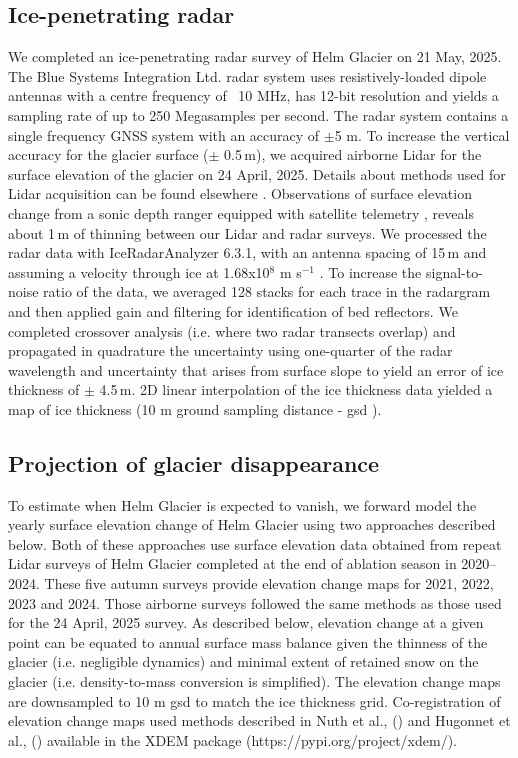 \documentclass[annals,twocolumn,letterpaper]{igs.cls}
\begin{document}
\subsection{Ice-penetrating radar}

We completed an ice-penetrating radar survey of Helm Glacier on 21 May, 2025. The Blue Systems Integration Ltd. radar system uses resistively-loaded dipole antennas with a centre frequency of ~10 MHz, has 12-bit resolution and yields a sampling rate of up to 250 Megasamples per second. The radar system contains a single frequency GNSS system with an accuracy of $\pm$5 m. To increase the vertical accuracy for the glacier surface ($\pm$ 0.5\,m), we acquired airborne Lidar for the surface elevation of the glacier on 24 April, 2025. Details about methods used for Lidar acquisition can be found elsewhere \citep{Menounos2025}.  Observations of surface elevation change from a sonic depth ranger equipped with satellite telemetry \cite{Bevington2025a}, reveals about 1\,m of thinning between our Lidar and radar surveys. We processed the radar data with IceRadarAnalyzer 6.3.1, with an antenna spacing of 15\,m and assuming a velocity through ice at 1.68x10$^{8}$ m s$^{-1}$ \citep{Reynolds2011}. To increase the signal-to-noise ratio of the data, we averaged 128 stacks for each trace in the radargram and then applied gain and filtering for identification of bed reflectors. We completed crossover analysis (i.e. where two radar transects overlap) and propagated in quadrature  the uncertainty using one-quarter of the radar wavelength \cite{Reynolds2011} and uncertainty that arises from surface slope to yield an error of ice thickness of $\pm$ 4.5\,m.  2D linear interpolation of the ice thickness data yielded a map of ice thickness (10 m ground sampling distance - gsd ). 

\subsection{Projection of glacier disappearance}

To estimate when Helm Glacier is expected to vanish, we forward model the yearly surface elevation change of Helm Glacier using two approaches described below. Both of these approaches use surface elevation data obtained from repeat Lidar surveys of Helm Glacier completed at the end of ablation season in 2020--2024. These five autumn surveys provide elevation change maps for 2021, 2022, 2023 and 2024.  Those airborne surveys followed the same methods as those used for the 24 April, 2025 survey. As described below, elevation change at a given point can be equated to annual surface mass balance given the thinness of the glacier (i.e. negligible dynamics) and minimal extent of retained snow on the glacier (i.e. density-to-mass conversion is simplified). The elevation change maps are downsampled to 10 m gsd to match the ice thickness grid. Co-registration of elevation change maps used methods described in Nuth et al.,  (\citeyear{Nuth2011}) and Hugonnet et al., (\citeyear{Hugonnet_2022}) available in the XDEM package (https://pypi.org/project/xdem/).
\end{document}
